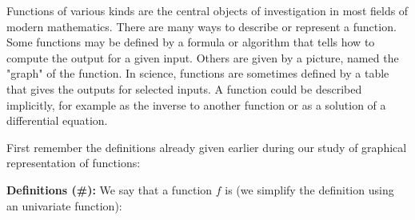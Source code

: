 	Functions of various kinds are the central objects of investigation in most fields of modern mathematics. There are many ways to describe or represent a function. Some functions may be defined by a formula or algorithm that tells how to compute the output for a given input. Others are given by a picture, named the "graph" of the function. In science, functions are sometimes defined by a table that gives the outputs for selected inputs. A function could be described implicitly, for example as the inverse to another function or as a solution of a differential equation.
	
	First remember the definitions already given earlier during our study of graphical representation of functions:
	
	\textbf{Definitions (\#\mydef):} We say that a function $f$ is (we simplify the definition using an univariate function):
